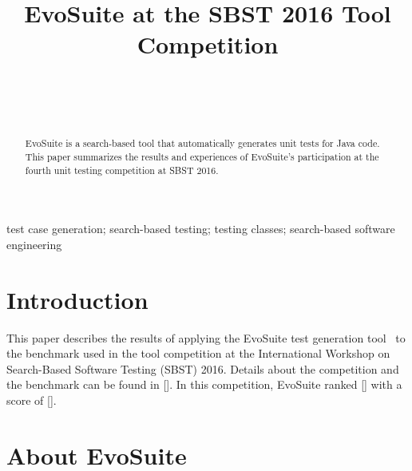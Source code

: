 \documentclass[10pt,conference,compsocconf]{IEEEtran}
\newcommand{\EVOSUITE}{{\sc EvoSuite}\xspace}
\begin{document}
\title{EvoSuite at the SBST 2016 Tool Competition}

\author{
\\
\and
{}
\\
}

\maketitle

\begin{abstract}
  \EVOSUITE is a search-based tool that automatically
  generates unit tests for Java code.  This paper summarizes the
  results and experiences of \EVOSUITE's participation at the fourth
  unit testing competition at SBST 2016. 
\end{abstract}

\begin{IEEEkeywords}
  test case generation; search-based testing; testing classes;
  search-based software engineering
\end{IEEEkeywords}


\section{Introduction}

This paper describes the results of applying the \EVOSUITE test
generation tool~\cite{FrA11c} to the benchmark used in the tool
competition at the International Workshop on Search-Based Software
Testing (SBST) 2016.  Details about the competition and the benchmark
can be found in []. 
In this competition, \EVOSUITE ranked [] with a score of [].

\section{About \EVOSUITE}
\end{document}
